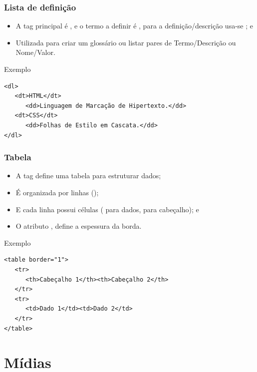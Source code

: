 \documentclass[aspectratio=169]{beamer} %
\begin{document}
\begin{frame}[fragile]
	\frametitle{Lista de definição}
	
	\begin{itemize}
		\item  A tag principal é , e o termo a definir é , para a definição/descrição usa-se ; e
		\item Utilizada para criar um glossário ou listar pares de Termo/Descrição ou Nome/Valor.
	\end{itemize}\vfill
	
	\begin{exampleblock}{Exemplo}
		\begin{lstlisting}
<dl>
   <dt>HTML</dt>
      <dd>Linguagem de Marcação de Hipertexto.</dd>
   <dt>CSS</dt>
      <dd>Folhas de Estilo em Cascata.</dd>
</dl>
		\end{lstlisting}
	\end{exampleblock}
\end{frame}

\begin{frame}[fragile]
	\frametitle{Tabela}
	
	\begin{itemize}
		\item  A tag  define uma tabela para estruturar dados;
		\item É organizada por linhas ();
		\item E cada linha possui células ( para dados,  para cabeçalho); e
		\item O atributo , define a espessura da borda.
	\end{itemize}
	
	\begin{exampleblock}{Exemplo}
		\begin{lstlisting}
<table border="1">
   <tr>
      <th>Cabeçalho 1</th><th>Cabeçalho 2</th>
   </tr>
   <tr>
      <td>Dado 1</td><td>Dado 2</td>
   </tr>
</table>
		\end{lstlisting}
	\end{exampleblock}
\end{frame}

\section{Mídias}
\end{document}
